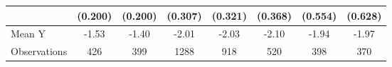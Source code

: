 {\begin{tabular}{l*{7}{c}}
            &     (0.200)         &     (0.200)         &     (0.307)         &     (0.321)         &     (0.368)         &     (0.554)         &     (0.628)         \\
\midrule
Mean Y      &       -1.53         &       -1.40         &       -2.01         &       -2.03         &       -2.10         &       -1.94         &       -1.97         \\
Observations&         426         &         399         &        1288         &         918         &         520         &         398         &         370         \\
\bottomrule
\end{tabular}
}
